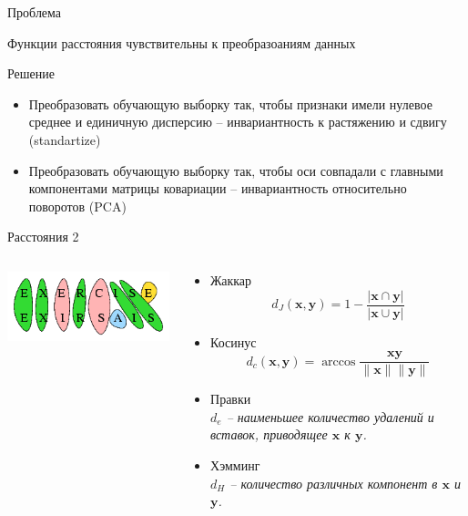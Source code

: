\documentclass[10pt]{beamer}
\begin{document}
\begin{frame}{Проблема}

Функции расстояния чувствительны к преобразоаниям данных

\vspace{1em}
Решение
\begin{itemize}
\item Преобразовать обучающую выборку так, чтобы  признаки имели нулевое среднее и единичную дисперсию -- инвариантность к растяжению и сдвигу (standartize)
\item Преобразовать обучающую выборку так, чтобы оси совпадали с главными компонентами матрицы ковариации -- инвариантность относительно поворотов (PCA)
\end{itemize}

\end{frame}

\begin{frame}{Расстояния 2}

\begin{columns}[T]

    \begin{column}{.4\textwidth}
    \vspace{5em}
	\begin{center}
   		\includegraphics[scale=0.5]{images/edit.png}
    \end{center}
    \end{column}
       
    \begin{column}{.6\textwidth}
    \begin{itemize}
		\item Жаккар
		\[
		d_J(\mathbf{x}, \mathbf{y}) = 1 - \frac{|\mathbf{x} \cap \mathbf{y}|}{|\mathbf{x} \cup \mathbf{y}|}
		\]
		\item Косинус
		\[
		d_c(\mathbf{x}, \mathbf{y}) = \arccos \frac{\mathbf{x} \mathbf{y}}{\|\mathbf{x}\| \|\mathbf{y}\|}
		\]
		\item Правки \\
		{\it $d_e$ -- наименьшее количество удалений и вставок, приводящее $\mathbf{x}$ к $\mathbf{y}$.}
		\item Хэмминг \\
		{\it $d_H$ -- количество различных компонент в $\mathbf{x}$ и $\mathbf{y}$.}
	\end{itemize}
    
    \end{column}
  \end{columns}

\end{frame}
\end{document}
